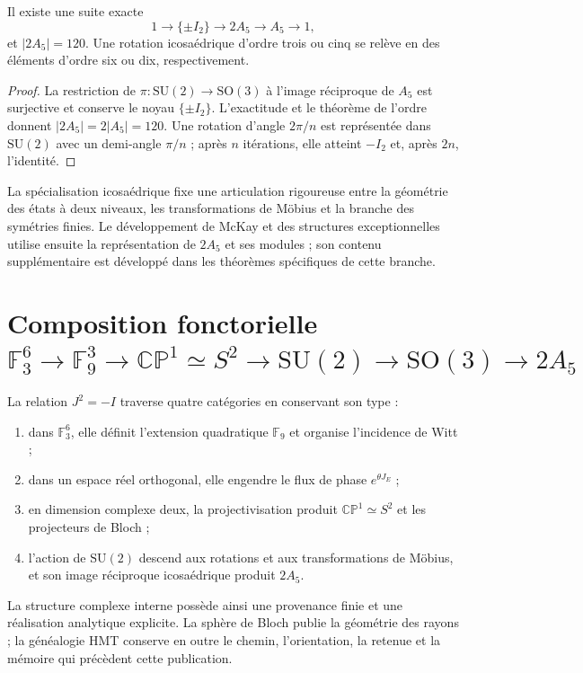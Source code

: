 \begin{proposition}
\label{prop:extension-central-2A5-anexo}
Il existe une suite exacte
\begin{equation}
 1\longrightarrow\{\pm I_2\}
 \longrightarrow2A_5
 \longrightarrow A_5
 \longrightarrow1,
 \label{eq:sucesion-2A5-anexo}
\end{equation}
et \(|2A_5|=120\). Une rotation icosaédrique d'ordre trois ou cinq se relève en
des éléments d'ordre six ou dix, respectivement.
\end{proposition}

\begin{proof}
La restriction de \(\pi:\mathrm{SU}(2)\to\mathrm{SO}(3)\) à l'image réciproque de
\(A_5\) est surjective et conserve le noyau \(\{\pm I_2\}\). L'exactitude et
le théorème de l'ordre donnent \(|2A_5|=2|A_5|=120\). Une rotation d'angle
\(2\pi/n\) est représentée dans \(\mathrm{SU}(2)\) avec un demi-angle
\(\pi/n\) ; après \(n\) itérations, elle atteint \(-I_2\) et, après
\(2n\), l'identité.
\end{proof}

La spécialisation icosaédrique fixe une articulation rigoureuse entre la géométrie des
états à deux niveaux, les transformations de Möbius et la branche des symétries
finies. Le développement de McKay et des structures exceptionnelles utilise
ensuite la représentation de \(2A_5\) et ses modules ; son contenu supplémentaire
est développé dans les théorèmes spécifiques de cette branche.

\section{Composition fonctorielle \texorpdfstring{\(\mathbb F_3^6\to\mathbb F_9^3\to\mathbb{CP}^{1}\simeq S^2\to\mathrm{SU}(2)\to\mathrm{SO}(3)\to 2A_5\)}{F3^6 -> F9^3 -> CP1 -> S2 -> SU(2) -> SO(3) -> 2A5}}

La relation \(J^2=-I\) traverse quatre catégories en conservant son type :
\begin{enumerate}
 \item dans \(\mathbb F_3^6\), elle définit l'extension quadratique
       \(\mathbb F_9\) et organise l'incidence de Witt ;
 \item dans un espace réel orthogonal, elle engendre le flux de phase
       \(e^{\theta J_E}\) ;
 \item en dimension complexe deux, la projectivisation produit
       \(\mathbb{CP}^{1}\simeq S^2\) et les projecteurs de Bloch ;
 \item l'action de \(\mathrm{SU}(2)\) descend aux rotations et aux
       transformations de Möbius, et son image réciproque icosaédrique produit
       \(2A_5\).
\end{enumerate}
La structure complexe interne possède ainsi une provenance finie et une
réalisation analytique explicite. La sphère de Bloch publie la géométrie des
rayons ; la généalogie HMT conserve en outre le chemin, l'orientation, la retenue et la
mémoire qui précèdent cette publication.
